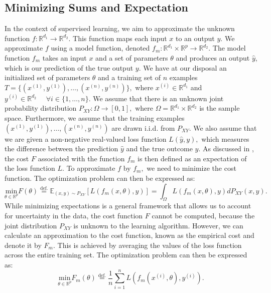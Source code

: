 \subsection{Minimizing Sums and Expectation}
In the context of supervised learning, we aim to approximate the unknown function $f: \mathbb{R}^{d_{1}}\rightarrow \mathbb{R}^{d_{2}}$. This function maps each input $x$ to an output $y$. We approximate $f$ using a model function, denoted $f_{m}: \mathbb{R}^{d_{1}}\times \mathbb{R}^{p}\rightarrow \mathbb{R}^{d_{2}}$. The model function $f_{m}$ takes an input $x$ and a set of parameters $\theta$ and produces an output $\hat{y}$, which is our prediction of the true output $y$. We have at our disposal an initialized set of parameters $\theta$ and a training set of $n$ examples $T=\{(x^{(1)},y^{(1)}),\ldots,(x^{(n)},y^{(n)})\},$ where $x^{(i)} \in \mathbb{R}^{d_{1}}$ and $y^{(i)} \in \mathbb{R}^{d_{2}} \text{ } \text{ } \forall i\in\{1,\ldots,n\}.$ We assume that there is an unknown joint probability distribution $P_{XY}:\Omega\rightarrow [0,1],$ where $\Omega = \mathbb{R}^{d_{1}} \times \mathbb{R}^{d_{2}}$ is the sample space. Furthermore, we assume that the training examples $(x^{(1)},y^{(1)}),\ldots,(x^{(n)},y^{(n)})$ are drawn i.i.d. from $P_{XY}.$ We also assume that we are given a non-negative real-valued loss function $L(\hat{y},y),$ which measures the difference between the prediction $\hat{y}$ and the true outcome $y.$ As discussed in \cite[20]{coursenotesML}, the cost $F$ associated with the function $f_{m}$ is then defined as an expectation of the loss function $L$. To approximate $f$ by $f_{m},$ we need to minimize the cost function. The optimization problem can then be expressed as:  
\begin{equation*}\label{min_expectations}\tag{5.2.1}
\underset{\theta \in \mathbb{R}^{p}}{\text{min}} F(\theta) \overset{\text{def.}}{=} \mathbb{E}_{(x,y)\sim P_{XY}}[L(f_{m}(x, \theta), y)] = \int_{\Omega} L(f_{m}(x, \theta), y) dP_{XY}(x,y).
\end{equation*}
While minimizing expectations is a general framework that allows us to account for uncertainty in the data, the cost function $F$ cannot be computed, because the joint distribution $P_{XY}$ is unknown to the learning algorithm. However, we can calculate an approximation to the cost function, known as the empirical cost and denote it by $F_{m}$. This is achieved by averaging the values of the loss function across the entire training set. The optimization problem can then be expressed as:
\begin{equation*}\label{largesums}\tag{5.2.2}
\underset{\theta \in \mathbb{R}^{p}}{\text{min}} F_{m}(\theta) \overset{\text{def.}}{=} \frac{1}{n} \sum_{i=1}^{n}L(f_{m}(x^{(i)}, \theta), y^{(i)}).
\end{equation*}
